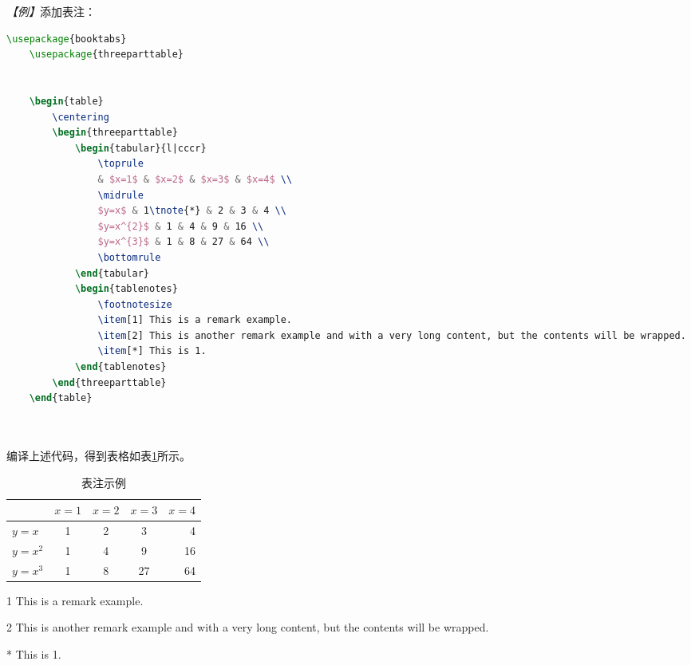 \emph{【例】}添加表注：
\begin{lstlisting}[language=TeX]
    \usepackage{booktabs}
    \usepackage{threeparttable}
    

    \begin{table}
        \centering
        \begin{threeparttable}
            \begin{tabular}{l|cccr}
                \toprule
                & $x=1$ & $x=2$ & $x=3$ & $x=4$ \\
                \midrule
                $y=x$ & 1\tnote{*} & 2 & 3 & 4 \\
                $y=x^{2}$ & 1 & 4 & 9 & 16 \\
                $y=x^{3}$ & 1 & 8 & 27 & 64 \\
                \bottomrule
            \end{tabular}
            \begin{tablenotes}
                \footnotesize
                \item[1] This is a remark example.
                \item[2] This is another remark example and with a very long content, but the contents will be wrapped.
                \item[*] This is 1.
            \end{tablenotes}
        \end{threeparttable}
    \end{table}

    
\end{lstlisting}

编译上述代码，得到表格如表\ref{tb9}所示。

\begin{table}[htbp]
    \centering
    \begin{threeparttable}
        \begin{tabular}{l|cccr}
            \toprule
                      & $x=1$      & $x=2$ & $x=3$ & $x=4$ \\
            \midrule
            $y=x$     & 1\tnote{*} & 2     & 3     & 4     \\
            $y=x^{2}$ & 1          & 4     & 9     & 16    \\
            $y=x^{3}$ & 1          & 8     & 27    & 64    \\
            \bottomrule
        \end{tabular}
        \begin{tablenotes}
            \footnotesize
            \item[1] This is a remark example.
            \item[2] This is another remark example and with a very long content, but the contents will be wrapped.
            \item[*] This is 1.
        \end{tablenotes}
    \end{threeparttable}
    \caption{表注示例}
    \label{tb9}
\end{table}

